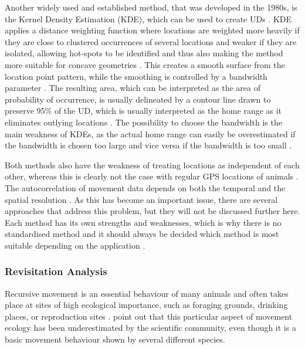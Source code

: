 Another widely used and established method, that was developed in the 1980s, is the Kernel Density Estimation (KDE), which can be used to create UDs \parencite{worton1989kernel}. KDE applies a distance weighting function where locations are weighted more heavily if they are close to clustered occurrences of several locations and weaker if they are isolated, allowing hot-spots to be identified and thus also making the method more suitable for concave geometries \parencite{laver2008critical}. This creates a smooth surface from the location point pattern, while the smoothing is controlled by a bandwidth parameter \parencite{downs2008effects}. The resulting area, which can be interpreted as the area of probability of occurrence, is usually delineated by a contour line drawn to preserve 95\% of the UD, which is usually interpreted as the home range as it eliminates outlying locations \parencite{houston2011breeding, laver2008critical}. The possibility to choose the bandwidth is the main weakness of KDEs, as the actual home range can easily be overestimated if the bandwidth is chosen too large and vice versa if the bandwidth is too small \parencite{seaman1996evaluation, worton1995using}.

Both methods also have the weakness of treating locations as independent of each other, whereas this is clearly not the case with regular GPS locations of animals \parencite{lyons2013home}. The autocorrelation of movement data depends on both the temporal and the spatial resolution \parencite{fieberg2007kernel}. As this has become an important issue, there are several approaches that address this problem, but they will not be discussed further here. Each method has its own strengths and weaknesses, which is why there is no standardised method and it should always be decided which method is most suitable depending on the application \parencite{halbrook2018estimated}.

\subsubsection{Revisitation Analysis}
Recursive movement is an essential behaviour of many animals and often takes place at sites of high ecological importance, such as foraging grounds, drinking places, or reproduction sites \parencite{barraquand2008animal, ohashi2005efficient, riotte2013periodicity}. \textcite{berger2015recursive} point out that this particular aspect of movement ecology has been underestimated by the scientific community, even though it is a basic movement behaviour shown by several different species.

